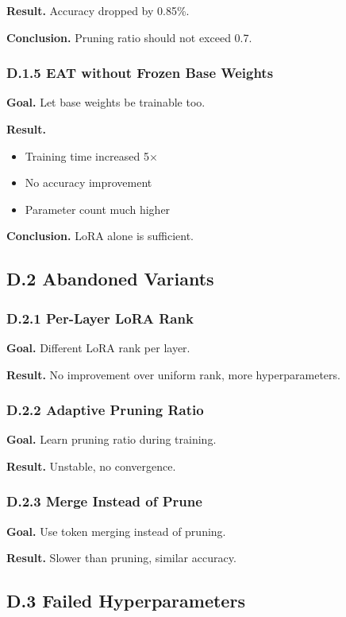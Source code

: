 \textbf{Result.} Accuracy dropped by 0.85\%.

\textbf{Conclusion.} Pruning ratio should not exceed 0.7.

\subsubsection{D.1.5 EAT without Frozen Base Weights}

\textbf{Goal.} Let base weights be trainable too.

\textbf{Result.} 
\begin{itemize}
\item Training time increased 5$\times$
\item No accuracy improvement
\item Parameter count much higher

\end{itemize}
\textbf{Conclusion.} LoRA alone is sufficient.

\subsection{D.2 Abandoned Variants}

\subsubsection{D.2.1 Per-Layer LoRA Rank}

\textbf{Goal.} Different LoRA rank per layer.

\textbf{Result.} No improvement over uniform rank, more hyperparameters.

\subsubsection{D.2.2 Adaptive Pruning Ratio}

\textbf{Goal.} Learn pruning ratio during training.

\textbf{Result.} Unstable, no convergence.

\subsubsection{D.2.3 Merge Instead of Prune}

\textbf{Goal.} Use token merging instead of pruning.

\textbf{Result.} Slower than pruning, similar accuracy.

\subsection{D.3 Failed Hyperparameters}

